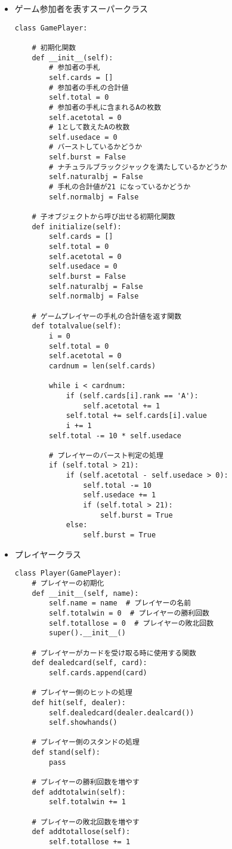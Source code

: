 \begin{itemize}
\item ゲーム参加者を表すスーパークラス
\begin{lstlisting}
class GamePlayer:

    # 初期化関数
    def __init__(self):
        # 参加者の手札
        self.cards = []  
        # 参加者の手札の合計値
        self.total = 0  
        # 参加者の手札に含まれるAの枚数
        self.acetotal = 0  
        # 1として数えたAの枚数
        self.usedace = 0  
        # バーストしているかどうか
        self.burst = False  
        # ナチュラルブラックジャックを満たしているかどうか
        self.naturalbj = False 
        # 手札の合計値が21 になっているかどうか
        self.normalbj = False  

    # 子オブジェクトから呼び出せる初期化関数
    def initialize(self):
        self.cards = []
        self.total = 0
        self.acetotal = 0
        self.usedace = 0
        self.burst = False
        self.naturalbj = False
        self.normalbj = False

    # ゲームプレイヤーの手札の合計値を返す関数
    def totalvalue(self):
        i = 0
        self.total = 0
        self.acetotal = 0
        cardnum = len(self.cards)

        while i < cardnum:
            if (self.cards[i].rank == 'A'):
                self.acetotal += 1
            self.total += self.cards[i].value
            i += 1
        self.total -= 10 * self.usedace

        # プレイヤーのバースト判定の処理
        if (self.total > 21):
            if (self.acetotal - self.usedace > 0):
                self.total -= 10
                self.usedace += 1
                if (self.total > 21):
                    self.burst = True
            else:
                self.burst = True

\end{lstlisting}
\end{itemize}

\begin{itemize}
\item プレイヤークラス
\begin{lstlisting}
class Player(GamePlayer):
    # プレイヤーの初期化
    def __init__(self, name):
        self.name = name  # プレイヤーの名前
        self.totalwin = 0  # プレイヤーの勝利回数
        self.totallose = 0  # プレイヤーの敗北回数
        super().__init__()

    # プレイヤーがカードを受け取る時に使用する関数
    def dealedcard(self, card):
        self.cards.append(card)

    # プレイヤー側のヒットの処理
    def hit(self, dealer):
        self.dealedcard(dealer.dealcard())
        self.showhands()

    # プレイヤー側のスタンドの処理
    def stand(self):
        pass

    # プレイヤーの勝利回数を増やす
    def addtotalwin(self):
        self.totalwin += 1

    # プレイヤーの敗北回数を増やす
    def addtotallose(self):
        self.totallose += 1

\end{lstlisting}
\end{itemize}


